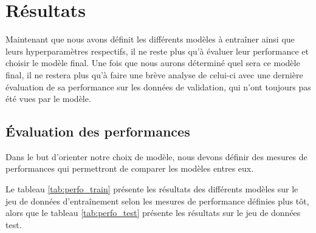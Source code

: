 \section{Résultats}
Maintenant que nous avons définit les différents modèles à entraîner ainsi que leurs hyperparamètres respectifs, il ne reste plus qu'à évaluer leur performance et choisir le modèle final. Une fois que nous aurons déterminé quel sera ce modèle final, il ne restera plus qu'à faire une brève analyse de celui-ci avec une dernière évaluation de sa performance sur les données de validation, qui n'ont toujours pas été vues par le modèle.  

\subsection{Évaluation des performances}
Dans le but d'orienter notre choix de modèle, nous devons définir des mesures de performances qui permettront de comparer les modèles entres eux.

Le tableau \ref{tab:perfo_train} présente les résultats des différents modèles sur le jeu de données d'entraînement selon les mesures de performance définies plus tôt, alors que le tableau \ref{tab:perfo_test} présente les résultats sur le jeu de données test.

